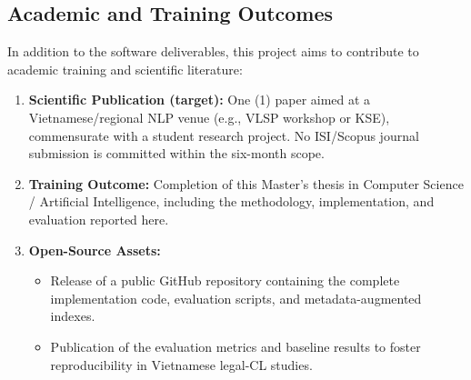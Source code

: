 \subsection{Academic and Training Outcomes}
In addition to the software deliverables, this project aims to contribute to academic training and scientific literature:
\begin{enumerate}
    \item \textbf{Scientific Publication (target):} One (1) paper aimed at a Vietnamese/regional NLP venue (e.g., VLSP workshop or KSE), commensurate with a student research project. No ISI/Scopus journal submission is committed within the six-month scope.
    \item \textbf{Training Outcome:} Completion of this Master's thesis in Computer Science / Artificial Intelligence, including the methodology, implementation, and evaluation reported here.
    \item \textbf{Open-Source Assets:}
    \begin{itemize}
        \item Release of a public GitHub repository containing the complete implementation code, evaluation scripts, and metadata-augmented indexes.
        \item Publication of the evaluation metrics and baseline results to foster reproducibility in Vietnamese legal-CL studies.
    \end{itemize}
\end{enumerate}
